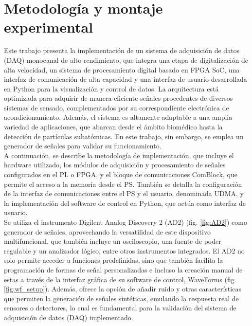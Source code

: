 \documentclass{report}
\begin{document}
\newpage 

\section{Metodología y montaje experimental}

\noindent Este trabajo presenta la implementación de un sistema de adquisición de datos (DAQ) monocanal de alto rendimiento, que integra una etapa de digitalización de alta velocidad, un sistema de procesamiento digital basado en FPGA SoC, una interfaz de comunicación de alta capacidad y una interfaz de usuario desarrollada en Python para la visualización y control de datos. La arquitectura está optimizada para adquirir de manera eficiente señales procedentes de diversos sistemas de sensado, complementados por su correspondiente electrónica de acondicionamiento. Además, el sistema es altamente adaptable a una amplia variedad de aplicaciones, que abarcan desde el ámbito biomédico hasta la detección de partículas subatómicas. En este trabajo, sin embargo, se emplea un generador de señales para validar su funcionamiento.\\

\noindent A continuación, se describe la metodología de implementación, que incluye el hardware utilizado, los módulos de adquisición y procesamiento de señales configurados en el PL o FPGA, y el bloque de comunicaciones ComBlock, que permite el acceso a la memoria desde el PS. También se detalla la configuración de la interfaz de comunicaciones entre el PS y el usuario, denominada UDMA, y la implementación del software de control en Python, que actúa como interfaz de usuario.\\



\noindent Se utiliza el instrumento Digilent Analog Discovery 2 (AD2) (fig. \ref{fig:AD2}) como generador de señales, aprovechando la versatilidad de este dispositivo multifuncional, que también incluye un osciloscopio, una fuente de poder regulable y un analizador lógico, entre otros instrumentos integrados. El AD2 no solo permite acceder a funciones predefinidas, sino que también facilita la programación de formas de señal personalizadas e incluso la creación manual de estas a través de la interfaz gráfica de su software de control, WaveForms (fig. \ref{fig:wf_setup}). Además, ofrece la opción de añadir ruido y otras características que permiten la generación de señales sintéticas, emulando la respuesta real de sensores o detectores, lo cual es fundamental para la validación del sistema de adquisición de datos (DAQ) implementado.
\end{document}
